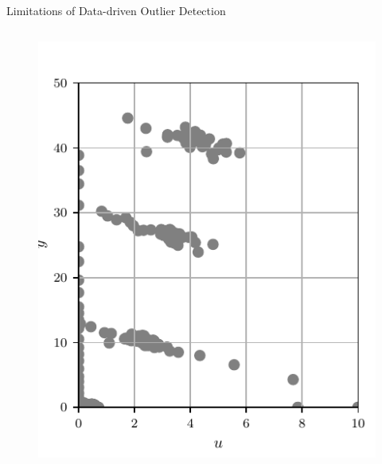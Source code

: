 \documentclass[aspectratio=169]{beamer}
\begin{document}
\begin{frame}{Limitations of Data-driven Outlier Detection}
\begin{columns}
\begin{column}{0.38\textwidth}
{\begin{figure}
                    \includegraphics[width=\textwidth]{../ilustrate/pc2023/sample/unlabeled_data.pdf}
                \end{figure}
            }
\end{column}
\end{columns}
\end{frame}
\end{document}
